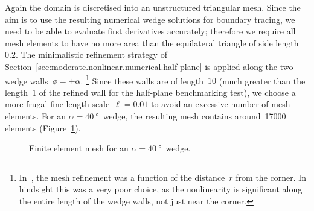Again the domain is discretised into an unstructured triangular mesh.
Since the aim is to use the resulting numerical wedge solutions
for boundary tracing,
we need to be able to evaluate first derivatives accurately;
therefore we require all mesh elements to have no more area than
the equilateral triangle of side length~$0.2$.
The minimalistic refinement strategy
of Section~\ref{sec:moderate.nonlinear.numerical.half-plane}
is applied along the two wedge walls~$\phi = \pm \alpha$.%
\footnote{
  In~\cite{li-2017-thesis-rounding-capillary-wedge},
  the mesh refinement was a function of the distance~$r$ from the corner.
  In hindsight this was a very poor choice,
  as the nonlinearity is significant
  along the entire length of the wedge walls,
  not just near the corner.
}
Since these walls are of length~$10$
(much greater than the length~$1$
of the refined wall for the half-plane benchmarking test),
we choose a more frugal fine length scale~$\ell = 0.01$
to avoid an excessive number of mesh elements.
For an $\alpha = \SI{40}{\degree}$~wedge,
the resulting mesh contains around~17000 elements
(Figure~\ref{fig:wedge_acute-mesh}).

\begin{figure}
  \centering
  \begin{subfigure}[t]{0.67\textwidth}
  \end{subfigure}
    \hfill
  \begin{subfigure}[t]{0.27\textwidth}
  \end{subfigure}
  \caption{
    Finite element mesh for an $\alpha = \SI{40}{\degree}$~wedge.
  }
  \label{fig:wedge_acute-mesh}
\end{figure}

